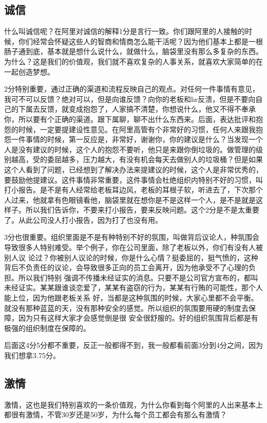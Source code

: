 \documentclass[12pt]{article}
\begin{document}
\subsection{诚信}
什么叫诚信呢？在阿里对诚信的解释1分是言行一致。你们跟阿里的人接触的时候，你们经常会怀疑这些人的智商和情商怎么能干活呢？因为他们基本上都是一根肠子通到底，基本就是想什么说什么，就做什么，脑袋里没有那么多复杂的东西。为什么？这是我们的价值观，我们就不喜欢复杂的人事关系，就喜欢大家简单的在一起创造梦想。

2分特别重要，通过正确的渠道和流程反映自己的观点。对任何一件事情有意见，我可不可以反馈？绝对可以，但是向谁反馈？向你的老板和hr反溃，但是不要向自己的下属去反馈，就变成抱怨了，人家搞不清楚，你想说什么，他又不得不奉承你，所以要有个正确的渠道。跟下属聊，聊不出什么东西来。后面，表达批评和抱怨的时候，一定要提建设性意见。在阿里高管有个非常好的习惯，任何人来跟我抱怨一件事情的时候，第一反应是，非常好，谢谢你，你的建议是什么？当发现一个人是没有建议的时候，这个人的抱怨不要听，他只是来跟你倒垃圾的。做管理的级别越高，受的委屈越多，压力越大，有没有机会每天去做别人的垃圾桶？但是如果这个人看到了问题，已经想到了解决办法来提建议的时候，这个人是非常优秀的，要鼓励他提建议。这件事情非常重要，这件事情会杜绝组织内特别不好的习惯，叫打小报告。是不是有人经常给老板耳边风，老板的耳根子软，听进去了，下次那个人过来，他就拿有色眼镜看他，脑袋里就在想你是不是这样一个人，是不是就是这样子。所以我们告诉你，不要来打小报告，要来反映问题。这个2分是不是太重要了。从此公司没人打小报告，因为打了也没有用。

3分也很重要。组织里面是不是有种特别不好的氛围，叫做背后议论人，种氛围会导致很多人特别难受。举个例子，你在公司里面，除了老板以外，你们有没有人被别人议 论过？你被别人议论的时候，你是什么心情？挺委屈的，挺气愤的，这种背后不负责任的议论，会导致很多正向的员工会离开，因为他承受不了心理的负担。所以我们特别 强调不传播未经证实的消息。只要不是公司官方宣布的，都叫未经证实。某某跟谁谈恋爱了，某某有盗窃的行为，某某有行贿的可能性，那个人能上位，因为他跟老板关系 好，当都是这种氛围的时候，大家心里都不会平衡。就没有那种蓝蓝的天，没有那种安全的感觉。所以组织的氛围要用硬的制度去保障，因为只有这样大家才会感觉倒是很 安全很舒服的。好的组织氛围背后都是有极强的组织制度在保障的。

后面这4分5分都不重要，反正一般都得不到，我一般都看前面3分到4分之间，因为我们想拿3.75分。

\subsection{激情}
激情，这也是我们特别喜欢的一条价值观，为什么你看到每个阿里的人出来基本上都很有激情，不管30岁还是50岁，为什么每个员工都会有那么有激情？
\end{document}
